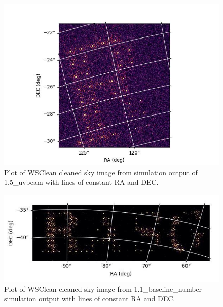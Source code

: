 \documentclass{article}
\begin{document}
\begin{figure}[h!]
    \centering
    \includegraphics[width=0.9\linewidth]{documentation_figures/cleaned_R.jpg}
    \caption{Plot of WSClean cleaned sky image from simulation output of 1.5\_uvbeam with lines of constant RA and DEC.}
    \label{fig:rclean}
\end{figure}

\begin{figure}[h!]
    \centering
    \includegraphics[width=0.9\linewidth]{documentation_figures/cleaned_RASG.jpg}
    \caption{Plot of WSClean cleaned sky image from 1.1\_baseline\_number simulation output with lines of constant RA and DEC.}
    \label{fig:rasgclean}
\end{figure}
\end{document}
